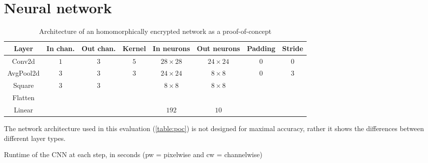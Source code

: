 \documentclass[a4paper,11pt,oneside]{report}
\begin{document}
\section{Neural network}\label{sec:eval_cnn}

\begin{table}[h!]
  \begin{center}
    \caption{Architecture of an homomorphically encrypted network as a proof-of-concept}
    \label{table:poc}
    \begin{tabular}{ c c c c c c c c }
    \hline
    Layer & In chan. & Out chan. & Kernel & In neurons & Out neurons & Padding & Stride \\
    \hline
    Conv2d & $1$ & $3$ & $5$ & $28 \times 28$ & $24 \times 24$ & $0$ & $0$ \\
    AvgPool2d & $3$ & $3$ & $3$ & $24 \times 24$ & $8 \times 8$ & $0$ & $3$ \\
    Square & $3$ & $3$ & & $8 \times 8$ & $8 \times 8$ &  &  \\
    Flatten \\
    Linear & & & & $192$ & $10$ & &  \\
    \hline
    \end{tabular}
  \end{center}
\end{table}

The network architecture used in this evaluation (\autoref{table:poc}) is not designed for maximal accuracy, rather it shows the differences between different layer types.

\begin{table}[h!]
  \begin{center}
    \caption{Runtime of the CNN at each step, in seconds (pw = pixelwise and cw = channelwise)}
    \label{table:cnn_runtime}
  \end{center}
\end{table}
\end{document}
